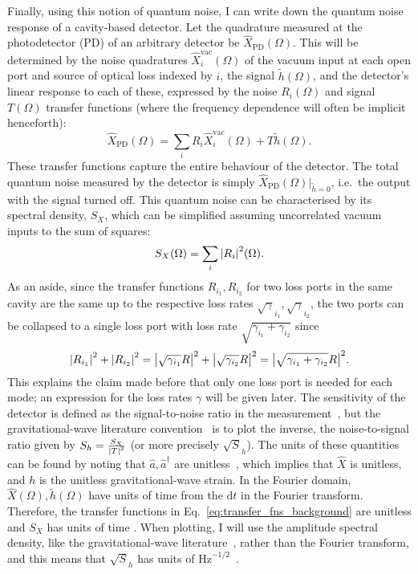 Finally, using this notion of quantum noise, I can write down the quantum noise response of a cavity-based detector. %
Let the quadrature measured at the photodetector (PD) of an arbitrary detector be $\hat{X}_\text{PD}(\Omega)$. This will be determined by the noise quadratures $\hat{X}_i^\text{vac}(\Omega)$ of the vacuum input at each open port and source of optical loss indexed by $i$, the signal $\tilde{h}(\Omega)$, and the detector's linear response to each of these, expressed by the noise $R_i(\Omega)$ and signal $T(\Omega)$ transfer functions (where the frequency dependence will often be implicit henceforth): \begin{equation}\label{eq:transfer_fns_background}\hat X_\text{PD}(\Omega)=\sum_i R_i \hat X_i^\text{vac}(\Omega) + T \tilde h(\Omega).\end{equation}
These transfer functions capture the entire behaviour of the detector. %
The total quantum noise measured by the detector is simply $\hat X_\text{PD}(\Omega)|_{\tilde h=0}$, i.e.\ the output with the signal turned off. This quantum noise can be characterised by its spectral density, $S_X$, which can be simplified assuming uncorrelated vacuum inputs to the sum of squares: \begin{equation}S_X(\Omega)=\sum_i \abs{R_i}^2(\Omega).\end{equation} 
As an aside, since the transfer functions $R_{i_1}, R_{i_2}$ for two loss ports in the same cavity are the same up to the respective loss rates $\sqrt\gamma_{i_1}, \sqrt\gamma_{i_2}$, the two ports can be collapsed to a single loss port with loss rate $\sqrt{\gamma_{i_1}+\gamma_{i_2}}$ since \begin{equation}\abs{R_{i_1}}^2+\abs{R_{i_2}}^2=\abs{\sqrt{\gamma_{i_1}}R}^2+\abs{\sqrt{\gamma_{i_2}}R}^2=\abs{\sqrt{\gamma_{i_1}+\gamma_{i_2}}R}^2.\end{equation} This explains the claim made before that only one loss port is needed for each mode; an expression for the loss rates $\gamma$ will be given later. 
The sensitivity of the detector is defined as the signal-to-noise ratio in the measurement~\cite{}, but the gravitational-wave literature convention~\cite{} is to plot the inverse, the noise-to-signal ratio given by $S_h = \frac{S_X}{\abs{T}^2}$ (or more precisely $\sqrt S_h$). The units of these quantities can be found by noting that $\hat a, \hat a^\dag$ are unitless~\cite{}, which implies that $\hat X$ is unitless, and $h$ is the unitless gravitational-wave strain. In the Fourier domain, $\hat X(\Omega), \tilde h(\Omega)$ have units of time from the $\text{d}t$ in the Fourier transform. Therefore, the transfer functions in Eq.~\ref{eq:transfer_fns_background} are unitless and $S_X$ has units of time . When plotting, I will use the amplitude spectral density, like the gravitational-wave literature~\cite{}, rather than the Fourier transform, and this means that $\sqrt S_h$ has units of $\text{Hz}^{-1/2}$~\cite{}. 

